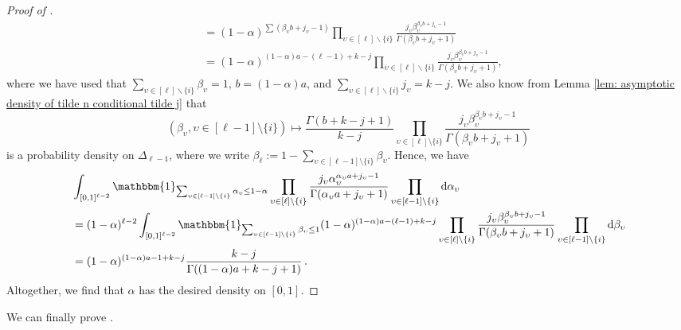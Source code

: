 \documentclass{article}
\theoremstyle{remark}
\newcommand{\One}[1]{\mathbbm{1}_{#1}}
\begin{document}
\begin{proof}[Proof of ]
\begin{align*}
    &= (1-\alpha)^{\sum (\beta_\upsilon b+j_\upsilon-1)} \prod_{\upsilon \in [\ell] \backslash \{i\}} \frac{j_\upsilon \beta_\upsilon^{\beta_\upsilon b +j_\upsilon-1}}{\Gamma(\beta_\upsilon b+j_\upsilon+1)} \\
    &= (1-\alpha)^{(1-\alpha) a-(\ell-1)+k-j} \prod_{\upsilon \in [\ell] \backslash \{i\}} \frac{j_\upsilon \beta_\upsilon^{\beta_\upsilon b +j_\upsilon-1}}{\Gamma(\beta_\upsilon b+j_\upsilon+1)},
\end{align*}
where we have used that $\sum\limits_{\upsilon \in [\ell] \backslash \{i\}} \beta_\upsilon = 1$, $b=(1-\alpha)a$, and $\sum\limits_{\upsilon \in [\ell] \backslash \{i\}} j_\upsilon = k-j$.
We also know from Lemma \ref{lem: asymptotic density of tilde n conditional tilde j} that 
\begin{equation*}
    (\beta_\upsilon, \upsilon\in[\ell-1]\setminus\{i\}) \mapsto \frac{\Gamma(b+k-j+1)}{k-j} \prod_{\upsilon\in[\ell]\setminus\{i\}} \frac{j_\upsilon \beta_\upsilon^{\beta_\upsilon b +j_\upsilon-1}}{\Gamma(\beta_\upsilon b+j_\upsilon +1)}
\end{equation*}
is a probability density on $\Delta_{\ell-1}$, where we write $\beta_\ell := 1 - \sum_{\upsilon\in[\ell-1]\setminus\{i\}} \beta_\upsilon$. 
Hence, we have
\begin{align*}
    &%
    \int_{[0,1]^{\ell-2}} \One{\sum_{\upsilon\in[\ell-1]\setminus\{i\}} \alpha_\upsilon \le 1-\alpha}
    \prod_{\upsilon \in [\ell] \backslash \{i\}} \frac{j_\upsilon \alpha_\upsilon^{\alpha_\upsilon a +j_\upsilon-1}}{\Gamma(\alpha_\upsilon a+j_\upsilon +1)} \prod_{\upsilon\in[\ell-1]\setminus\{i\}}\mathrm{d}\alpha_\upsilon 
    \\&= (1-\alpha)^{\ell-2} 
    \int_{[0,1]^{\ell-2}} \One{\sum_{\upsilon\in[\ell-1]\setminus\{i\}} \beta_\upsilon \le 1}
    (1-\alpha)^{(1-\alpha) a-(\ell-1)+k-j} \prod_{\upsilon \in [\ell] \backslash \{i\}} \frac{j_\upsilon \beta_\upsilon^{\beta_\upsilon b +j_\upsilon-1}}{\Gamma(\beta_\upsilon b+j_\upsilon +1)} \prod_{\upsilon\in[\ell-1]\setminus\{i\}}\mathrm{d}\beta_\upsilon \\
    &= (1-\alpha)^{(1-\alpha) a-1+k-j} \frac{k-j}{\Gamma((1-\alpha)a+k-j+1)} \,.
\end{align*}
Altogether, we find that $\alpha$ has the desired density on $[0,1]$.
\end{proof}

We can finally prove .
\end{document}
